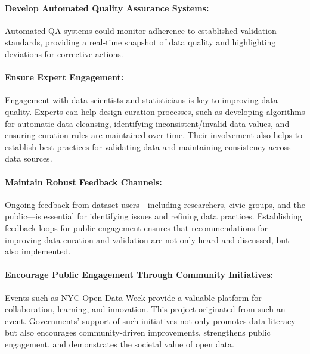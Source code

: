 \documentclass[linenumber]{jdsart}
\begin{document}
\paragraph{Develop Automated Quality Assurance Systems:}
\label{par:qa}
Automated QA systems could monitor adherence to 
established validation standards, providing a 
real-time snapshot of data quality and 
highlighting deviations for corrective actions.

\paragraph{Ensure Expert Engagement:}
\label{par:experts}
Engagement with data scientists and statisticians is key to improving 
data quality. Experts can help design curation processes, 
such as developing algorithms for automatic data 
cleansing, identifying inconsistent/invalid data values, and ensuring curation
rules are maintained over time. Their involvement also
helps to establish best practices for validating data and
maintaining consistency across data sources. 

\paragraph{Maintain Robust Feedback Channels:}
\label{par:feedback}
Ongoing feedback from dataset users—including researchers, civic groups, 
and the public—is essential for identifying issues 
and refining data practices. Establishing feedback loops 
for public engagement ensures that recommendations 
for improving data curation and validation 
are not only heard and discussed, but also implemented. 

\paragraph{Encourage Public Engagement Through Community Initiatives:}
\label{par:engagement}
Events such as NYC Open Data Week provide a valuable platform for 
collaboration, learning, and innovation. This project originated from 
such an event. Governments’ support of such initiatives not 
only promotes data literacy but also encourages community-driven 
improvements, strengthens public engagement, and demonstrates the 
societal value of open data.


\end{document}
